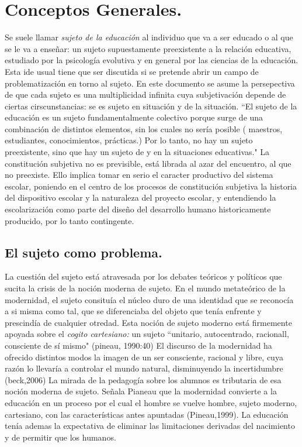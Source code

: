 \documentclass[a4paper,12pt,spanish]{book}
\begin{document}
\chapter {Conceptos Generales.}


Se suele llamar \textit{sujeto de la educación} al individuo que va a ser educado o al que se le va a enseñar:
un sujeto supuestamente preexistente a la relación educativa, estudiado por la psicología evolutiva y 
en general por las ciencias de la educación. Esta ide usual tiene que ser discutida si se pretende abrir un 
campo de problematización en torno al sujeto. En este documento se asume la persepectiva de que cada sujeto 
es una multiplicidad infinita cuya subjetivación depende de ciertas cirscunstancias: se es sujeto en situación y 
de la situación. ``El sujeto de la educación es un sujeto fundamentalmente colectivo porque surge de una combinación 
de distintos elementos, sin los cuales no sería posible ( maestros, estudiantes, conocimientos, prácticas.) Por lo 
tanto, no hay un sujeto preexistente, sino que hay un sujeto de y en la situaciones educativas."  La constitución 
subjetiva no es previsible, está librada al azar del encuentro, al que no preexiste. Ello implica tomar en serio el 
caracter productivo del sistema escolar, poniendo en el centro de los procesos de constitución subjetiva la historia 
del dispositivo escolar y la naturaleza del proyecto escolar, y entendiendo la escolarización como parte del diseño del 
desarrollo humano historicamente producido, por lo tanto contingente.

\section {El sujeto como problema.}

La cuestión del sujeto está atravesada por los debates teóricos y políticos que sucita la crisis de la noción
moderna de sujeto. En el mundo metateórico de la modernidad, el sujeto consituía el núcleo duro de una identidad que 
se reconocía a si misma como tal, que se diferenciaba del objeto que tenía enfrente y prescindía de cualquier otredad. Esta 
noción de sujeto moderno está firmemente apoyada sobre el \textit{cogito cartesiano:} un sujeto ``unitario, autocentrado,
racionall, consciente de sí mismo" (pineau, 1990:40)
El discurso de la modernidad ha ofrecido distintos modos la imagen de un ser consciente, racional y libre,
cuya razón lo llevaría a controlar el mundo natural, disminuyendo la incertidumbre (beck,2006)
La mirada de la pedagogía sobre los alumnos es tributaria de esa noción moderna de sujeto. Señala Pianeau que 
la modernidad convierte a la educación en un proceso por el cual el hombre se vuelve hombre, sujeto moderno,
cartesiano, con las características antes apuntadas (Pineau,1999). La educación tenía ademas la expectativa de eliminar
las limitaciones derivadas del nacimiento y de permitir que los humanos.
\cite{cerletti2008}


\end{document}
